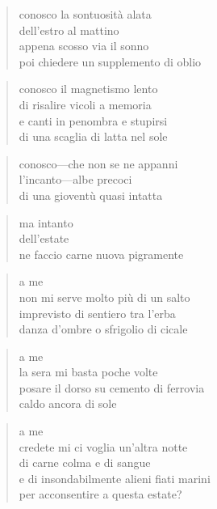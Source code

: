 \begin{verse}
    conosco la sontuosità alata\\
    dell'estro al mattino\\
    appena scosso via il sonno\\
    poi chiedere un supplemento di oblio
\end{verse}

\begin{verse}
    conosco il magnetismo lento\\
    di risalire vicoli a memoria\\
    e canti in penombra e stupirsi\\
    di una scaglia di latta nel sole
\end{verse}

\begin{verse}
    conosco—che non se ne appanni\\
    l’incanto—albe precoci\\
    di una gioventù quasi intatta
\end{verse}

\begin{verse}
    ma intanto\\
    dell’estate\\
    ne faccio carne nuova
    pigramente
\end{verse}

\clearpage


\begin{verse}
    a me\\
    non mi serve molto più di un salto\\
    imprevisto di sentiero tra l'erba\\
    danza d'ombre o sfrigolio di cicale
\end{verse}

\begin{verse}
    a me\\
    la sera mi basta poche volte\\
    posare il dorso su cemento di ferrovia\\
    caldo ancora di sole
\end{verse}

\begin{verse}
    a me\\
    credete mi ci voglia un'altra notte\\
    di carne colma e di sangue\\
    e di insondabilmente alieni fiati marini\\
    per acconsentire a questa estate?
\end{verse}

